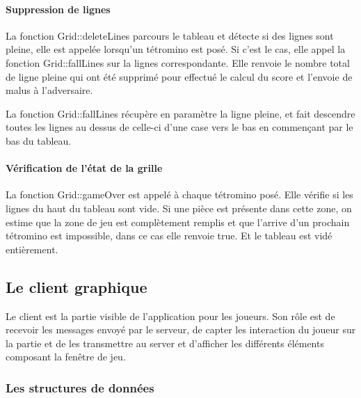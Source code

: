 \documentclass[a4paper, 12pt]{article}
\begin{document}
			\paragraph{Suppression de lignes}
				La fonction Grid::deleteLines parcours le tableau et détecte si des lignes sont pleine, elle est appelée lorsqu'un tétromino est posé.
				Si c’est le cas, elle appel la fonction Grid::fallLines sur la lignes correspondante.
				Elle renvoie le nombre total de ligne pleine qui ont été supprimé pour effectué le calcul du score et l’envoie de malus à l’adversaire.

				La fonction Grid::fallLines récupère en paramètre la ligne pleine, et fait descendre toutes les lignes au dessus de celle-ci d’une case vers le bas en commençant par le bas du tableau.

			\paragraph{Vérification de l’état de la grille}

				La fonction Grid::gameOver est appelé à chaque tétromino posé. Elle vérifie si les lignes du haut du tableau sont vide. Si une pièce est présente dans cette zone, on estime que la zone de jeu est complètement remplis et que l’arrive d’un prochain tétromino est impossible, dans ce cas elle renvoie true. Et le tableau est vidé entièrement.

	\subsection{Le client graphique}

		Le client est la partie visible de l’application pour les joueurs. Son rôle est de recevoir les messages envoyé par le serveur, de capter les interaction du joueur sur la partie et de les transmettre au server et d’afficher les différents éléments composant la fenêtre de jeu.

		\subsubsection{Les structures de données}
\end{document}
